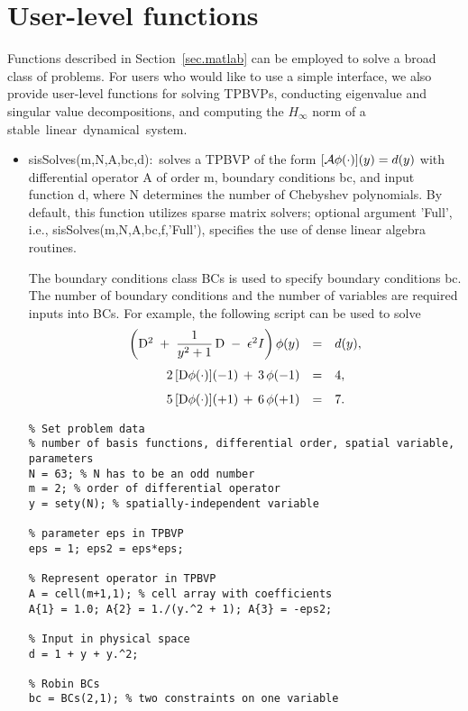 \documentclass[%
secnumarabic,%
 amssymb, amsmath,%
 aps,prf,superscriptaddress,longbibliography
frontmatterverbose,
]{revtex4-2}
\begin{document}
		\vspace*{-3ex}
\section{User-level functions}
	\vspace*{-2ex}
	
Functions described in Section~\ref{sec.matlab} can be employed to solve a broad class of problems. For users who would like to use a simple interface, we also provide user-level functions for solving TPBVPs, conducting eigenvalue and singular value decompositions, and computing the $H_\infty$ norm of a \mbox{stable linear dynamical system.}
\begin{itemize}
  \item {\sf sisSolves(m,N,A,bc,d):}~solves a TPBVP of the form $[ \MM A \phi (\cdot) ] (y) = d(y)$ with differential operator {\sf A} of order {\sf m}, boundary conditions {\sf bc}, and input function {\sf d}, where {\sf N} determines the number of Chebyshev polynomials. By default, this function utilizes sparse matrix solvers; optional argument {\sf 'Full'}, i.e., {\sf sisSolves(m,N,A,bc,f,'Full')}, specifies the use of dense linear algebra routines.
  
The boundary conditions class {\sf BCs} is used to specify boundary conditions {\sf bc}. The number of boundary conditions and the number of variables are required inputs into {\sf BCs}. For example, the following script can be used to solve
	\[
	\ba{rcl}
    	\left( 
 	\mathrm  D^{2} \; + \; \dfrac{1}{y^2 + 1} \, \mathrm D \; - \; \epsilon^2 I 
 	\right) 
 	\phi (y) 
 	& = & 
 	d(y),
	\\[0.45cm]
	2\, [\mathrm D \phi (\cdot)] (-1) \,+\, 3\, \phi (-1) 
	& = &  
	4,
	\\[0.25cm]
	5\, [\mathrm D \phi (\cdot)](+1) \,+\, 6\, \phi (+1) 
	& = & 
	7.
 	\ea
 \]	
\begin{lstlisting}
% Set problem data
% number of basis functions, differential order, spatial variable, parameters
N = 63; % N has to be an odd number
m = 2; % order of differential operator
y = sety(N); % spatially-independent variable

% parameter eps in TPBVP
eps = 1; eps2 = eps*eps;

% Represent operator in TPBVP
A = cell(m+1,1); % cell array with coefficients
A{1} = 1.0; A{2} = 1./(y.^2 + 1); A{3} = -eps2;

% Input in physical space
d = 1 + y + y.^2;
 
% Robin BCs
bc = BCs(2,1); % two constraints on one variable


\end{lstlisting}
\end{itemize}
\end{document}
